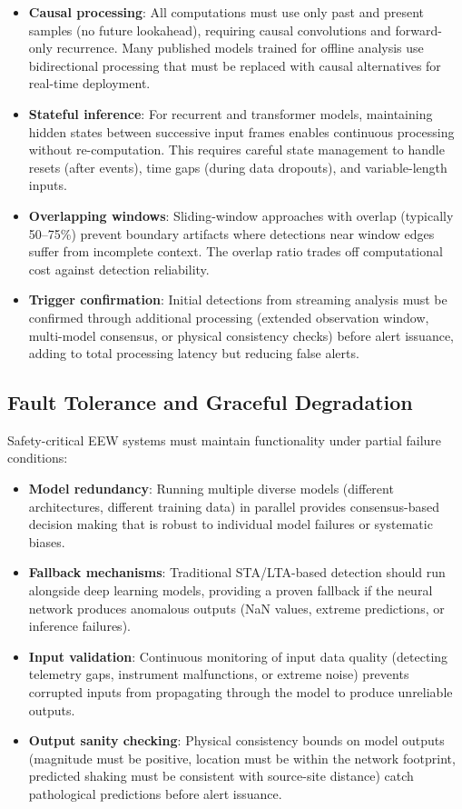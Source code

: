 \documentclass[review,authoryear]{elsarticle}
\begin{document}
\begin{itemize}
\item \textbf{Causal processing}: All computations must use only past and present samples (no future lookahead), requiring causal convolutions and forward-only recurrence. Many published models trained for offline analysis use bidirectional processing that must be replaced with causal alternatives for real-time deployment.
\item \textbf{Stateful inference}: For recurrent and transformer models, maintaining hidden states between successive input frames enables continuous processing without re-computation. This requires careful state management to handle resets (after events), time gaps (during data dropouts), and variable-length inputs.
\item \textbf{Overlapping windows}: Sliding-window approaches with overlap (typically 50--75\%) prevent boundary artifacts where detections near window edges suffer from incomplete context. The overlap ratio trades off computational cost against detection reliability.
\item \textbf{Trigger confirmation}: Initial detections from streaming analysis must be confirmed through additional processing (extended observation window, multi-model consensus, or physical consistency checks) before alert issuance, adding to total processing latency but reducing false alerts.
\end{itemize}

\subsection{Fault Tolerance and Graceful Degradation}

Safety-critical EEW systems must maintain functionality under partial failure conditions:

\begin{itemize}
\item \textbf{Model redundancy}: Running multiple diverse models (different architectures, different training data) in parallel provides consensus-based decision making that is robust to individual model failures or systematic biases.
\item \textbf{Fallback mechanisms}: Traditional STA/LTA-based detection should run alongside deep learning models, providing a proven fallback if the neural network produces anomalous outputs (NaN values, extreme predictions, or inference failures).
\item \textbf{Input validation}: Continuous monitoring of input data quality (detecting telemetry gaps, instrument malfunctions, or extreme noise) prevents corrupted inputs from propagating through the model to produce unreliable outputs.
\item \textbf{Output sanity checking}: Physical consistency bounds on model outputs (magnitude must be positive, location must be within the network footprint, predicted shaking must be consistent with source-site distance) catch pathological predictions before alert issuance.
\end{itemize}
\end{document}
